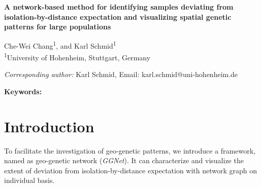 \documentclass[11pt]{article}
\begin{document}
\begin{flushleft}
\textbf{A network-based method for identifying samples deviating from isolation-by-distance expectation and visualizing spatial genetic patterns for large populations}

\vspace{2ex}

Che-Wei Chang\textsuperscript{1}, and Karl Schmid\textsuperscript{1}\\[1ex]

\textsuperscript{1}University of Hohenheim, Stuttgart, Germany\\


\vspace{2ex}

\textit{Corresponding author:} Karl Schmid, Email: karl.schmid@uni-hohenheim.de


\end{flushleft}

\newpage
\begin{abstract}
\small

\end{abstract}
\textbf{Keywords:} 

\newpage




\section*{Introduction}





To facilitate the investigation of geo-genetic patterns, we introduce a framework, named as geo-genetic network (\textit{GGNet}).
It can characterize and visualize the extent of deviation from isolation-by-distance expectation with network graph on individual basis.
\end{document}
